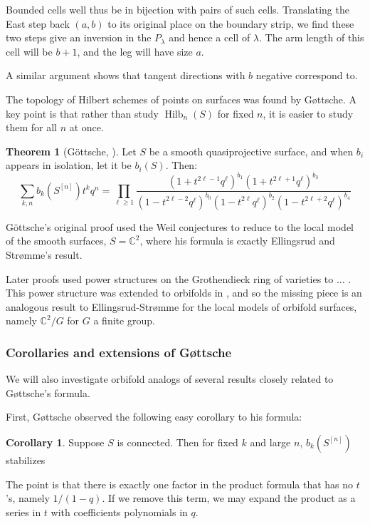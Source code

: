 \documentclass{amsart}[12pt]
\theoremstyle{definition}
\newtheorem{theorem}[dummy]{Theorem}
\newtheorem{corollary}[dummy]{Corollary}
\newcommand{\C}{\mathbb{C}}
\DeclareMathOperator{\Hilb}{Hilb}
\begin{document}
Bounded cells well thus be in bijection with pairs of such cells.  Translating the East step back $(a,b)$ to its original place on the boundary strip, we find these two steps give an inversion in the $P_\lambda$ and hence a cell of $\lambda$.  The arm length of this cell will be $b+1$, and the leg will have size $a$. 

A similar argument shows that tangent directions with $b$ negative correspond to. 



The topology of Hilbert schemes of points on surfaces was found by G\o ttsche.  A key point is that rather than study $\Hilb_n(S)$ for fixed $n$, it is easier to study them for all $n$ at once.


\begin{theorem}[G\"ottsche, \cite{gottsche}]
Let $S$ be a smooth quasiprojective surface, and when $b_i$ appears in isolation, let it be $b_i(S)$.  Then:
$$\sum_{k,n} b_k(S^{[n]})t^k q^n=\prod_{\ell\geq 1} \frac{(1+t^{2\ell-1}q^\ell)^{b_1}(1+t^{2\ell+1}q^\ell)^{b_3}}{(1-t^{2\ell-2}q^\ell)^{b_0}(1-t^{2\ell}q^\ell)^{b_2}(1-t^{2\ell+2}q^\ell)^{b_4}}$$
\end{theorem}

G\"ottsche's original proof used the Weil conjectures to reduce to the local model of the smooth surfaces, $S=\C^2$, where his formula is exactly Ellingsrud and Str\o mme's result.

Later proofs used power structures on the Grothendieck ring of varieties to  ...
.  This power structure was extended to orbifolds in \cite{}, and so the missing piece is an analogous result to Ellingsrud-Str\o mme for the local models of orbifold surfaces, namely $\C^2/G$ for $G$ a finite group.  

\subsubsection{Corollaries and extensions of G\o ttsche}
We will also investigate orbifold analogs of several results closely related to G\o ttsche's formula.

First, G\o ttsche observed the following easy corollary to his formula:
\begin{corollary}  Suppose $S$ is connected.
Then for fixed $k$ and large $n$, $b_{k}(S^{[n]})$ stabilizes
\end{corollary}

The point is that there is exactly one factor in the product formula that has no $t$'s, namely $1/(1-q)$.  If we remove this term, we may expand the product as a series in $t$ with coefficients polynomials in $q$.
\end{document}
